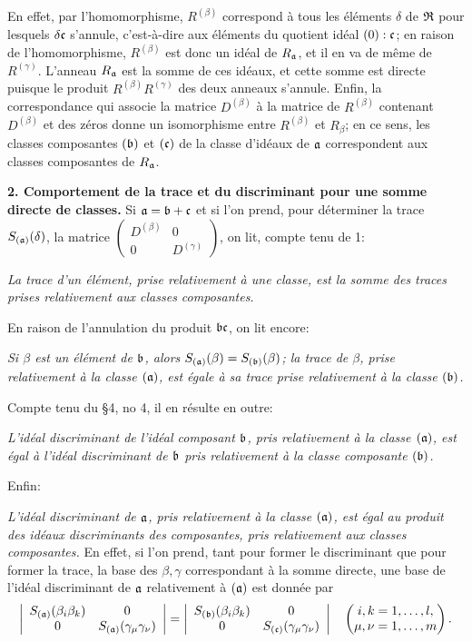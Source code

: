 En effet, par l'homomorphisme, $R^{(\beta)}$ correspond à tous les éléments $\delta$ de $\mathfrak R$ pour lesquels $\delta\mathfrak c$ s'annule, c'est-à-dire aux éléments du quotient idéal $(0):\mathfrak c$; en raison de l'homomorphisme, $R^{(\beta)}$ est donc un idéal de $R_\mathfrak a$, et il en va de même de $R^{(\gamma)}$. L'anneau $R_\mathfrak a$ est la somme de ces idéaux, et cette somme est directe puisque le produit $R^{(\beta)}R^{(\gamma)}$ des deux anneaux s'annule. Enfin, la correspondance qui associe la matrice $D^{(\beta)}$ à la matrice de $R^{(\beta)}$ contenant $D^{(\beta)}$ et des zéros donne un isomorphisme entre $R^{(\beta)}$ et $R_\beta$; en ce sens, les classes composantes $(\mathfrak b)$ et $(\mathfrak c)$ de la classe d'idéaux de $\mathfrak a$ correspondent aux classes composantes de $R_\mathfrak a$.

\textbf{2. Comportement de la trace et du discriminant pour une somme directe de classes.} Si $\mathfrak a=\mathfrak b+\mathfrak c$ et si l'on prend, pour déterminer la trace $S_{(\mathfrak a)}(\delta)$, la matrice
$\left(\begin{smallmatrix}D^{(\beta)}&0\\0&D^{(\gamma)}\end{smallmatrix}\right)$,
on lit, compte tenu de 1:

\emph{La trace d'un élément, prise relativement à une classe, est la somme des traces prises relativement aux classes composantes.}

En raison de l'annulation du produit $\mathfrak b\mathfrak c$, on lit encore:

\emph{Si $\beta$ est un élément de $\mathfrak b$, alors $S_{(\mathfrak a)}(\beta)=S_{(\mathfrak b)}(\beta)$; la trace de $\beta$, prise relativement à la classe $(\mathfrak a)$, est égale à sa trace prise relativement à la classe $(\mathfrak b)$.}

Compte tenu du \S 4, no 4, il en résulte en outre:

\emph{L'idéal discriminant de l'idéal composant $\mathfrak b$, pris relativement à la classe $(\mathfrak a)$, est égal à l'idéal discriminant de $\mathfrak b$ pris relativement à la classe composante $(\mathfrak b)$.}

Enfin:

\emph{L'idéal discriminant de $\mathfrak a$, pris relativement à la classe $(\mathfrak a)$, est égal au produit des idéaux discriminants des composantes, pris relativement aux classes composantes.} En effet, si l'on prend, tant pour former le discriminant que pour former la trace, la base des $\beta,\gamma$ correspondant à la somme directe, une base de l'idéal discriminant de $\mathfrak a$ relativement à $(\mathfrak a)$ est donnée par
\[
\left|
\begin{array}{cc}
S_{(\mathfrak a)}(\beta_i\beta_k)&0\\
0&S_{(\mathfrak a)}(\gamma_\mu\gamma_\nu)
\end{array}
\right|
=
\left|
\begin{array}{cc}
S_{(\mathfrak b)}(\beta_i\beta_k)&0\\
0&S_{(\mathfrak c)}(\gamma_\mu\gamma_\nu)
\end{array}
\right|
\quad
\left(
\begin{matrix}
 i,k=1,\ldots,l,\\
 \mu,\nu=1,\ldots,m
\end{matrix}
\right).
\]

